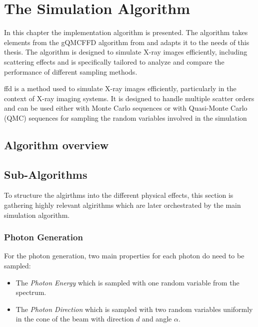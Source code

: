 \chapter{The Simulation Algorithm} %
\label{Chapter5} %


In this chapter the implementation algorithm is presented. The algorithm takes
elements from the gQMCFFD algorithm from \cite{qmcXray2023} and adapts it to the
needs of this thesis. The algorithm is designed to simulate X-ray images
efficiently, including scattering effects and is specifically tailored to
analyze and compare the performance of different sampling methods.

\ac{ffd} is a method used to simulate X-ray images efficiently, particularly in the context of X-ray imaging systems. It is designed to handle multiple scatter orders and can be used either with Monte Carlo sequences or with Quasi-Monte Carlo (QMC) sequences for sampling the random variables involved in the simulation
\section{Algorithm overview}


\section{Sub-Algorithms}
To structure the algirthms into the different physical effects, this section is
gathering highly relevant algirithms which are later orchestrated by the main
simulation algorithm.

\subsection{Photon Generation}
For the photon generation, two main properties for each photon do need to be
sampled:

\begin{itemize}
    \item The \emph{Photon Energy} which is sampled with one random variable
    from the spectrum.
    \item The \emph{Photon Direction} which is sampled with two random 
    variables uniformly in the cone of the beam with direction $d$ and angle
    $\alpha$. 
\end{itemize}

